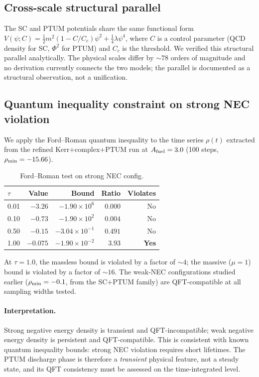 \subsection{Cross-scale structural parallel}

The SC and PTUM potentials share the same functional form
$V(\psi;C) = \tfrac12 m^2(1 - C/C_c)\psi^2 + \tfrac14\lambda\psi^4$,
where $C$ is a control parameter (QCD density for SC, $\Phi^2$ for
PTUM) and $C_c$ is the threshold. We verified this structural
parallel analytically. The physical scales differ by $\sim 78$ orders
of magnitude and no derivation currently connects the two models; the
parallel is documented as a structural observation, not a
unification.


\subsection{Quantum inequality constraint on strong NEC violation}

We apply the Ford--Roman quantum inequality to the time series
$\rho(t)$ extracted from the refined Kerr+complex+PTUM run at
$A_{\rm fuel} = 3.0$ (100 steps, $\rho_{\rm min} = -15.66$).

\begin{table}[h]
\centering
\footnotesize
\caption{Ford--Roman test on strong NEC config.}
\label{tab:ford_roman_strong}
\begin{tabular}{lrrrr}
\hline
$\tau$ & Value & Bound & Ratio & Violates \\
\hline
0.01 & $-3.26$ & $-1.90\times 10^{6}$ & $0.000$ & No \\
0.10 & $-0.73$ & $-1.90\times 10^{2}$ & $0.004$ & No \\
0.50 & $-0.15$ & $-3.04\times 10^{-1}$ & $0.491$ & No \\
1.00 & $-0.075$ & $-1.90\times 10^{-2}$ & $3.93$ & \textbf{Yes} \\
\hline
\end{tabular}
\end{table}

At $\tau = 1.0$, the massless bound is violated by a factor of
$\sim 4$; the massive ($\mu = 1$) bound is violated by a factor
of $\sim 16$. The weak-NEC configurations studied earlier
($\rho_{\rm min} = -0.1$, from the SC$+$PTUM family) are
QFT-compatible at all sampling widths tested.

\paragraph{Interpretation.}
Strong negative energy density is transient and QFT-incompatible;
weak negative energy density is persistent and QFT-compatible.
This is consistent with known quantum inequality bounds: strong
NEC violation requires short lifetimes. The PTUM discharge phase
is therefore a \emph{transient} physical feature, not a steady
state, and its QFT consistency must be assessed on the
time-integrated level.


